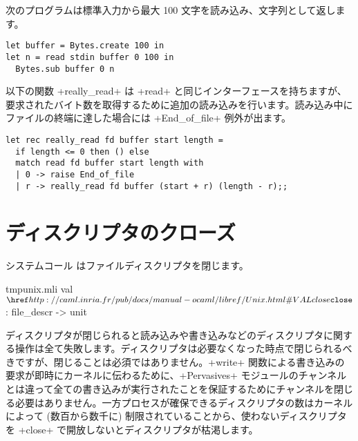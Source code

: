 \begin{example}
次のプログラムは標準入力から最大 100 文字を読み込み、文字列として返します。
%
\begin{lstlisting}
let buffer = Bytes.create 100 in
let n = read stdin buffer 0 100 in
  Bytes.sub buffer 0 n
\end{lstlisting}
\end{example}

\begin{example}
以下の関数 \ml+really_read+ は \ml+read+ と同じインターフェースを持ちますが、要求されたバイト数を取得するために追加の読み込みを行います。読み込み中にファイルの終端に達した場合には \ml+End_of_file+ 例外が出ます。
%
\begin{lstlisting}
let rec really_read fd buffer start length =
  if length <= 0 then () else
  match read fd buffer start length with
  | 0 -> raise End_of_file
  | r -> really_read fd buffer (start + r) (length - r);;
\end{lstlisting}
%
\end{example}

\section{ディスクリプタのクローズ}

システムコール  はファイルディスクリプタを閉じます。
%
\begin{listingcodefile}{tmpunix.mli}
val $\libvalue{Unix}{close}$ : file_descr -> unit
\end{listingcodefile}
%

ディスクリプタが閉じられると読み込みや書き込みなどのディスクリプタに関する操作は全て失敗します。ディスクリプタは必要なくなった時点で閉じられるべきですが、閉じることは必須ではありません。\ml+write+ 関数による書き込みの要求が即時にカーネルに伝わるために、\ml+Pervasives+ モジュールのチャンネルとは違って全ての書き込みが実行されたことを保証するためにチャンネルを閉じる必要はありません。一方プロセスが確保できるディスクリプタの数はカーネルによって (数百から数千に) 制限されていることから、使わないディスクリプタを \ml+close+ で開放しないとディスクリプタが枯渇します。

